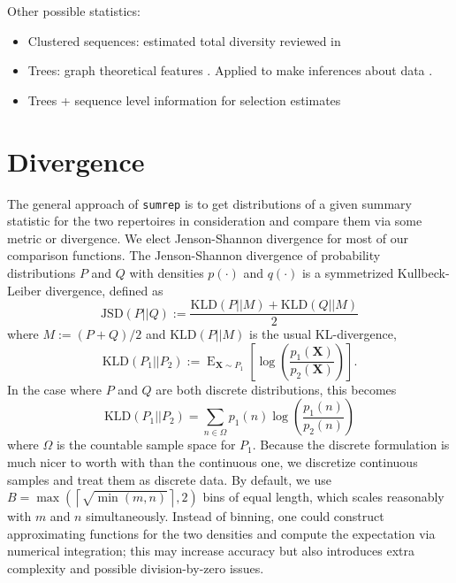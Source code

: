 \documentclass{article}
\begin{document}
Other possible statistics:

\begin{itemize}
\item Clustered sequences: estimated total diversity reviewed in \cite{Mehr2012-se}
\item Trees: graph theoretical features \cite{Dunn-Walters2002-cu,Dunn-Walters2004-hv,Mehr2004-ej,Shahaf2008-cc,Budeus2015-ab,Yaari2015-ss}.
Applied to make inferences about data \cite{Steiman-Shimony2006-fm}.
\item Trees + sequence level information for selection estimates \cite{Uduman2014-pb}
\end{itemize}


\section*{Divergence}
The general approach of \texttt{sumrep} is to get distributions of a given summary statistic for the two repertoires in consideration and compare them via some metric or divergence.
We elect Jenson-Shannon divergence for most of our comparison functions.
The Jenson-Shannon divergence of probability distributions $P$ and $Q$ with densities $p(\cdot)$ and $q(\cdot)$ is a symmetrized Kullbeck-Leiber divergence, defined as
\begin{equation}
\text{JSD}\left(P || Q\right) := \frac{\text{KLD}\left(P || M\right) + \text{KLD}\left(Q || M\right)}{2}
\end{equation}
where $M := (P + Q)/2$ and $\text{KLD}(P || M)$ is the usual KL-divergence,
\begin{equation}
\text{KLD}\left(P_1 || P_2\right) := \operatorname{E}_{\mathbf X \sim P_1}\left[ \log\left(\frac{p_1(\mathbf X)}{p_2(\mathbf X)}\right) \right].
\end{equation}
In the case where $P$ and $Q$ are both discrete distributions, this becomes
\begin{equation}
\text{KLD}\left(P_1 || P_2\right) = \sum_{n \in \Omega} p_1(n) \log\left( \frac{p_1(n)}{p_2(n)} \right)
\end{equation}
where $\Omega$ is the countable sample space for $P_1$.
Because the discrete formulation is much nicer to worth with than the continuous one, we discretize continuous samples and treat them as discrete data.
By default, we use $B = \max\left(\left\lceil \sqrt{\min(m, n)} \right \rceil, 2\right)$ bins of equal length, which scales reasonably with $m$ and $n$ simultaneously.
Instead of binning, one could construct approximating functions for the two densities and compute the expectation via numerical integration; this may increase accuracy but also introduces extra complexity and possible division-by-zero issues.
\end{document}

